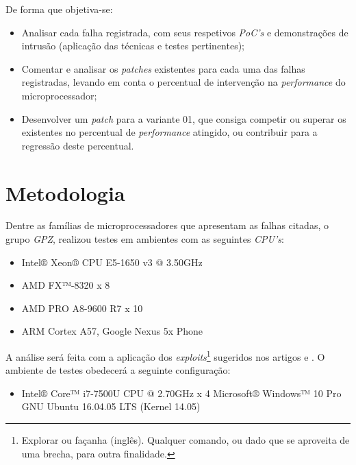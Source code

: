 \documentclass[
	12pt,				%
	openright,			%
	oneside,            %
	a4paper,			%
	chapter=TITLE,		%
	section=TITLE,		%
	subsection=TITLE,	%
	subsubsection=TITLE,%
	english,			%
	brazil,				%
]{abntex2}
\begin{document}
De forma que objetiva-se:

\begin{itemize}
    \item Analisar cada falha registrada, com seus respetivos \emph{PoC's} e demonstrações de intrusão (aplicação das técnicas e testes pertinentes);
    \item Comentar e analisar os \emph{patches} existentes para cada uma das falhas registradas, levando em conta o percentual de intervenção na \emph{performance} do microprocessador;
    \item Desenvolver um \emph{patch} para a variante 01, que consiga competir ou superar os existentes no percentual de \emph{performance} atingido, ou contribuir para a regressão deste percentual.
\end{itemize}

\chapter{Metodologia}

Dentre as famílias de microprocessadores que apresentam as falhas citadas, o grupo \emph{GPZ}, realizou testes em ambientes com as seguintes \emph{CPU's}:

\begin{itemize}
    \item Intel® Xeon® CPU E5-1650 v3 @ 3.50GHz
    \item AMD FX™-8320 x 8
    \item AMD PRO A8-9600 R7 x 10
    \item ARM Cortex A57, Google Nexus 5x Phone
\end{itemize}

A análise será feita com a aplicação dos \emph{exploits}\footnote{Explorar ou façanha (inglês). Qualquer comando, ou dado que se aproveita de uma brecha, para outra finalidade.} sugeridos nos artigos  e . O ambiente de testes obedecerá a seguinte configuração:

\begin{itemize}
    \item Intel® Core™ i7-7500U CPU @ 2.70GHz x 4 
    \subitem Microsoft® Windows™ 10 Pro
    \subitem GNU Ubuntu 16.04.05 LTS (Kernel 14.05)
\end{itemize}

\begingroup
\renewcommand{\cleardoublepage}{}
\renewcommand{\clearpage}{}

\end{document}
